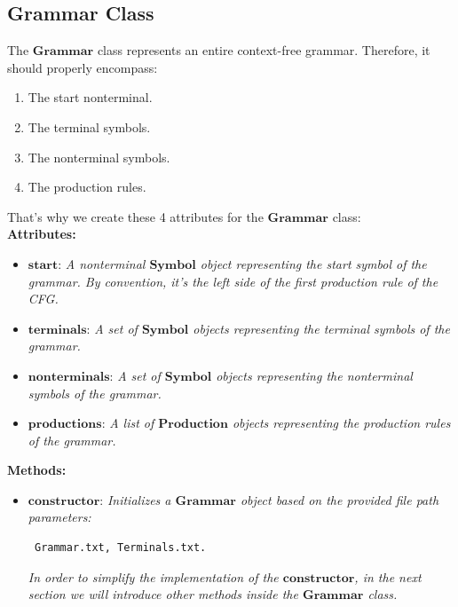 \vspace{10pt}

\subsection{Grammar Class}

The \(\boldsymbol{Grammar}\) class represents an entire context-free grammar. Therefore, it should properly encompass:

\begin{enumerate}
    \item The start nonterminal.
    \item The terminal symbols.
    \item The nonterminal symbols.
    \item The production rules.
\end{enumerate}

That’s why we create these 4 attributes for the \(\boldsymbol{Grammar}\) class:\\

\textbf{Attributes:}
\begin{itemize}
    \item \(\boldsymbol{start}\): \textit{A nonterminal \(\boldsymbol{Symbol}\) object representing the start symbol of the grammar. By convention, it’s the left side of the first production rule of the CFG.}
    \item \(\boldsymbol{terminals}\): \textit{A set of \(\boldsymbol{Symbol}\) objects representing the terminal symbols of the grammar.}
    \item \(\boldsymbol{nonterminals}\): \textit{A set of \(\boldsymbol{Symbol}\) objects representing the nonterminal symbols of the grammar.}
    \item \(\boldsymbol{productions}\): \textit{A list of \(\boldsymbol{Production}\) objects representing the production rules of the grammar.}
\end{itemize}

\textbf{Methods:}
\begin{itemize}
    \item \(\boldsymbol{constructor}\): \textit{Initializes a \(\boldsymbol{Grammar}\) object based on the provided file path parameters:}
    \begin{verbatim} Grammar.txt, Terminals.txt.\end{verbatim}
    \textit{In order to simplify the implementation of the \(\boldsymbol{constructor}\), in the next section we will introduce other methods inside the \(\boldsymbol{Grammar}\) class.}
\end{itemize}

